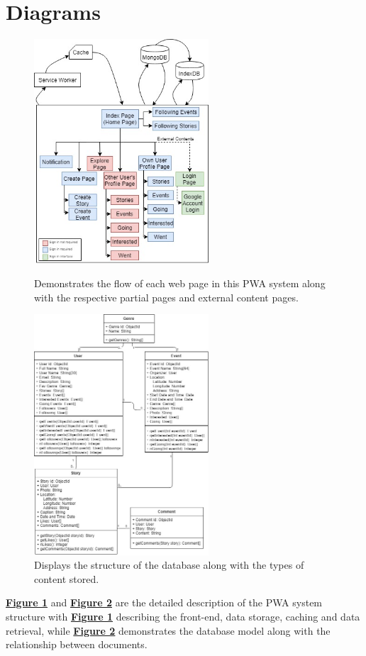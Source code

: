 \documentclass[11pt, a4paper]{article}
\begin{document}
\section{Diagrams}
\begin{figure}[H]
  \begin{center}
    \begin{minipage}[b]{0.4\textwidth}
      \includegraphics[width=6.5cm]{site_map.jpg}
      \caption{Demonstrates the flow of each web page in this PWA system along with the respective
      partial pages and external content pages.}
      \label{figure:site_map}
    \end{minipage}
    \qquad
    \begin{minipage}[b]{0.4\textwidth}
      \includegraphics[width=6.5cm]{uml.jpg}
      \caption{Displays the structure of the database along with the types of content stored.}
      \label{figure:uml}
    \end{minipage}
  \end{center}
\end{figure}
\hyperref[figure:site_map]{\textbf{Figure 1}} and \hyperref[figure:uml]{\textbf{Figure 2}} are the
detailed description of the PWA system structure with \hyperref[figure:site_map]{\textbf{Figure 1}}
describing the front-end, data storage, caching and data retrieval, while
\hyperref[figure:uml]{\textbf{Figure 2}} demonstrates the database model along with
the relationship between documents.
\end{document}
